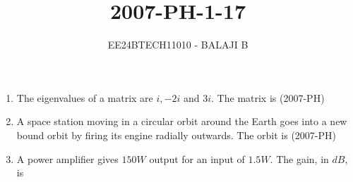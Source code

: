 \documentclass[journal]{IEEEtran}
\begin{document}

\vspace{3cm}

\title{2007-PH-1-17}
\author{EE24BTECH11010 - BALAJI B}
{\let\newpage\relax\maketitle}

\renewcommand{\thefigure}{\theenumi}
\renewcommand{\thetable}{\theenumi}
\setlength{\intextsep}{10pt} %
\renewcommand{\thetable}{\theenumi}
\begin{enumerate}
    \item The eigenvalues of a matrix are $i, -2i$ and $3i$. The matrix is \hfill (2007-PH)
    \begin{enumerate}
    \end{enumerate}
    \item A space station moving in a circular orbit around the Earth goes into a new bound orbit by firing its engine radially outwards. The orbit is \hfill (2007-PH)
    \begin{enumerate}
    \end{enumerate}
    \item A power amplifier gives $150W$ output for an input of $1.5W$. The gain, in $dB$, is
    

\end{enumerate}
\end{document}
